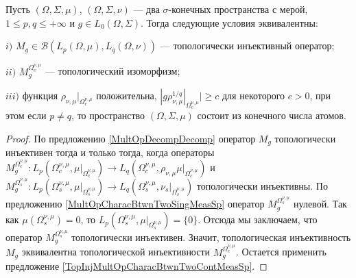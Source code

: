 \begin{proposition}\label{TopInjMultOpCharacBtwnTwoMeasSp} Пусть $(\Omega,\Sigma,\mu)$, $(\Omega,\Sigma,\nu)$ --- два $\sigma$-конечных пространства с мерой, $1\leq p,q\leq +\infty$ и $g\in L_0(\Omega,\Sigma)$. Тогда следующие условия эквивалентны:

$i)$ $M_g\in\mathcal{B}(L_p(\Omega,\mu), L_q(\Omega,\nu))$ --- топологически инъективный оператор;

$ii)$ $M_g^{\Omega_c^{\nu,\mu}}$ --- топологический изоморфизм;

$iii)$ функция $\rho_{\nu,\mu}|_{\Omega_c^{\nu,\mu}}$ положительна, $|g \rho_{\nu,\mu}^{1/q}|_{\Omega_c^{\nu,\mu}}|\geq c$ для некоторого $c>0$, при этом если $p\neq q$, то пространство $(\Omega,\Sigma,\mu)$ состоит из конечного числа атомов.
\end{proposition}
\begin{proof}
По предложению \ref{MultOpDecompDecomp} оператор $M_g$ топологически инъективен тогда и только тогда, когда операторы $M_g^{\Omega_c^{\nu,\mu}}:L_p(\Omega_c^{\nu,\mu},\mu|_{\Omega_c^{\nu,\mu}})\to L_q(\Omega_c^{\nu,\mu},\rho_{\nu,\mu} \mu|_{\Omega_c^{\nu,\mu}})$ и $M_g^{\Omega_s^{\nu,\mu}}:L_p(\Omega_s^{\nu,\mu},\mu|_{\Omega_s^{\nu,\mu}})\to L_q(\Omega_s^{\nu,\mu},\nu_s|_{\Omega_s^{\nu,\mu}})$  топологически инъективны. По предложению \ref{MultOpCharacBtwnTwoSingMeasSp} оператор $M_g^{\Omega_s^{\nu,\mu}}$ нулевой. Так как $\mu(\Omega_s^{\nu,\mu})=0$, то $L_p(\Omega_s^{\nu,\mu},\mu|_{\Omega_s^{\nu,\mu}})=\{0\}$. Отсюда мы заключаем, что оператор $M_g^{\Omega_s^{\nu,\mu}}$ топологически инъективен. Значит, топологическая инъективность $M_g$ эквивалентна топологической инъективности  $M_g^{\Omega_c^{\nu,\mu}}$. Остается применить предложение \ref{TopInjMultOpCharacBtwnTwoContMeasSp}.
\end{proof}

